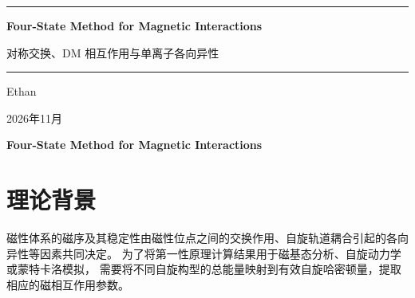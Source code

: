 \documentclass[openany]{book}
\theoremstyle{mydefinition}
\theoremstyle{myplain}
\begin{document}
\raggedbottom

\begin{titlepage}
    \thispagestyle{empty}
    \centering
    \vspace*{2cm}
    {\color{myblue}\rule{\textwidth}{2pt}}\par
    \vspace{1.5cm}
    {\color{myblue}\Huge\textbf{Four-State Method for Magnetic Interactions}}\par
    \vspace{0.5cm}
    \vspace{0.5cm}
    {\color{myblue}\Large 对称交换、DM 相互作用与单离子各向异性}\par
    \vspace{1.5cm}
    {\color{myblue}\rule{\textwidth}{2pt}}\par
    \vspace{4cm}
    {\Large Ethan}\par
    \vspace{0.5cm}
    {\large 2026年11月}\par
    \vfill
\end{titlepage}

\setcounter{page}{1}
\tableofcontents
\newpage

\vspace*{-0.5cm}
\begin{center}
    {\color{black}\heiti\Large\bfseries Four-State Method for Magnetic Interactions}
\end{center}
\vspace{0.3em}
\setcounter{section}{0}

\section{理论背景}

磁性体系的磁序及其稳定性由磁性位点之间的交换作用、自旋轨道耦合引起的各向异性等因素共同决定。
为了将第一性原理计算结果用于磁基态分析、自旋动力学或蒙特卡洛模拟，
需要将不同自旋构型的总能量映射到有效自旋哈密顿量，提取相应的磁相互作用参数。
\end{document}
